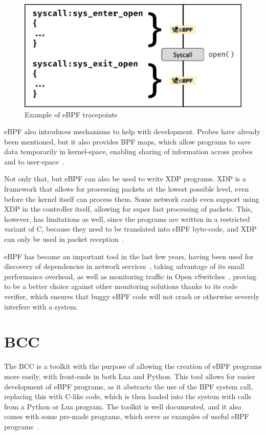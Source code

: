 \begin{figure}[htb]
   \centering
   \includegraphics[scale=.35]{syscall}
   \caption{Example of eBPF tracepoints}\label{fig:syscall}
\end{figure}

eBPF also introduces mechanisms to help with development. Probes have already
been mentioned, but it also provides BPF maps, which allow programs to save data
temporarily in kernel-space, enabling sharing of information across probes and
to user-space~\cite{lwm}.

Not only that, but eBPF can also be used to write \ac{XDP} programs. \ac{XDP} is
a framework that allows for processing packets at the lowest possible level,
even before the kernel itself can process them. Some network cards even support
using \ac{XDP} in the controller itself, allowing for super fast processing of
packets. This, however, has limitations as well, since the programs are written
in a restricted variant of C, because they need to be translated into eBPF
byte-code, and \ac{XDP} can only be used in packet reception~\cite{xdp}.

eBPF has become an important tool in the last few years, having been used for
discovery of dependencies in network services~\cite{ebpfeg1}, taking advantage
of its small performance overhead, as well as monitoring traffic in Open
vSwitches~\cite{ebpfeg2}, proving to be a better choice against other monitoring
solutions thanks to its code verifier, which ensures that buggy eBPF code will
not crash or otherwise severely interfere with a system.


\section{BCC}

The \ac{BCC} is a toolkit with the purpose of allowing the creation of eBPF
programs more easily, with front-ends in both Lua and Python. This tool allows
for easier development of eBPF programs, as it abstracts the use of the \ac{BPF}
system call, replacing this with C-like code, which is then loaded into the
system with calls from a Python or Lua program. The toolkit is well documented,
and it also comes with some pre-made programs, which serve as examples of useful
eBPF programs~\cite{gregg,bcc}.

